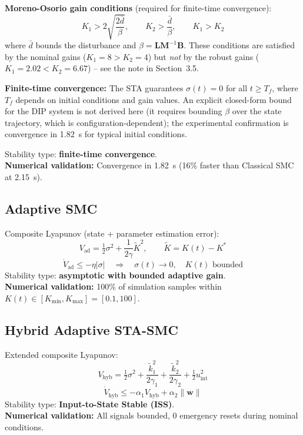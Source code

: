 \documentclass[11pt, a4paper]{article}
\begin{document}
\textbf{Moreno-Osorio gain conditions} (required for finite-time convergence):
\begin{equation}
  K_1 > 2\sqrt{\frac{2\bar{d}}{\beta}}, \qquad K_2 > \frac{\bar{d}}{\beta}, \qquad K_1 > K_2
  \label{eq:sta_conditions}
\end{equation}
where $\bar{d}$ bounds the disturbance and $\beta = \mathbf{L}\mathbf{M}^{-1}\mathbf{B}$.
These conditions are satisfied by the nominal gains ($K_1=8 > K_2=4$) but
\textit{not} by the robust gains ($K_1=2.02 < K_2=6.67$) -- see the note in Section~3.5.

\textbf{Finite-time convergence:} The STA guarantees $\sigma(t) = 0$ for all
$t \geq T_f$, where $T_f$ depends on initial conditions and gain values.
An explicit closed-form bound for the DIP system is not derived here
(it requires bounding $\beta$ over the state trajectory, which is
configuration-dependent); the experimental confirmation is convergence
in 1.82~s for typical initial conditions.

Stability type: \textbf{finite-time convergence}.\\
\textbf{Numerical validation:} Convergence in 1.82~s
(16\% faster than Classical SMC at 2.15~s).

\subsection{Adaptive SMC}

Composite Lyapunov (state + parameter estimation error):
\begin{equation}
  V_\text{ad} = \tfrac{1}{2}\sigma^2 + \frac{1}{2\gamma}\tilde{K}^2,
  \qquad \tilde{K} = K(t) - K^*
  \label{eq:lyap_adaptive}
\end{equation}
\begin{equation}
  \dot{V}_\text{ad} \leq -\eta|\sigma| \quad \Rightarrow \quad
  \sigma(t) \to 0, \quad K(t) \text{ bounded}
\end{equation}
Stability type: \textbf{asymptotic with bounded adaptive gain}.\\
\textbf{Numerical validation:} 100\% of simulation samples within
$K(t) \in [K_\text{min}, K_\text{max}] = [0.1, 100]$.

\subsection{Hybrid Adaptive STA-SMC}

Extended composite Lyapunov:
\begin{equation}
  V_\text{hyb} = \tfrac{1}{2}\sigma^2
    + \frac{\tilde{k}_1^2}{2\gamma_1}
    + \frac{\tilde{k}_2^2}{2\gamma_2}
    + \tfrac{1}{2}u_\text{int}^2
\end{equation}
\begin{equation}
  \dot{V}_\text{hyb} \leq -\alpha_1 V_\text{hyb} + \alpha_2\|\bm{w}\|
\end{equation}
Stability type: \textbf{Input-to-State Stable (ISS)}.\\
\textbf{Numerical validation:} All signals bounded, 0 emergency resets
during nominal conditions.
\end{document}
